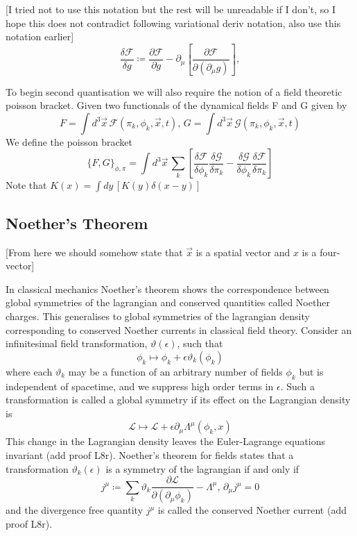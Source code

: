 \documentclass[11pt, a4paper]{article}
\theoremstyle{definition}
\theoremstyle{plain}
\begin{document}
[I tried not to use this notation but the rest will be unreadable if I don't, so I hope this
does not contradict following variational deriv notation, also use this notation earlier]
\begin{equation}
  \frac{\delta \mathcal{F}}{\delta g} \coloneq \frac{\partial \mathcal{F}}{\partial g}
  - \partial_\mu \left[ \frac{\partial \mathcal{F}}{\partial (\partial_\mu g)} \right],
\end{equation}

To begin second quantisation we will also require the notion of a field theoretic poisson bracket.
Given two functionals of the dynamical fields F and G given by 
\begin{equation}
  F = \int{d^3\vec{x}\, \mathcal{F}(\pi_k, \phi_k, \vec{x}, t)},\,
  G = \int{d^3\vec{x}\, \mathcal{G}(\pi_k, \phi_k, \vec{x}, t)}
\end{equation}
We define the poisson bracket
\begin{equation}
  {\{F, G \}}_{\phi,\pi} = \int{d^3\vec{x}\,
  \sum_{k}{\left[ \frac{\delta \mathcal{F}}{\delta \phi_k}\frac{\delta \mathcal{G}}{\delta \pi_k} 
- \frac{\delta \mathcal{G}}{\delta \phi_k}\frac{\delta \mathcal{F}}{\delta \pi_k} \right]}  }
\end{equation}
Note that $K({x}) = \int{d{y}\,[K({y}) \delta(x - y)]}$


\subsection{Noether's Theorem}
[From here we should somehow state that $\vec{x}$ is a spatial vector and $x$ is a four-vector]

In classical mechanics Noether's theorem shows the correspondence between global symmetries of 
the lagrangian and conserved quantities called Noether charges. This generalises to global symmetries
of the lagrangian density corresponding to conserved Noether currents in classical field theory.
Consider an infinitesimal field transformation, $\vartheta(\epsilon)$, such that
\begin{equation}
  \phi_k \mapsto \phi_k + \epsilon\vartheta_k(\phi_k)
\end{equation}
where each $\vartheta_k$ may be a function of an arbitrary number of fields $\phi_k$ but
is independent of spacetime, and we suppress high order terms in $\epsilon$.
Such a transformation is called a global symmetry if its effect on the Lagrangian density is
\begin{equation}
  \mathcal{L} \mapsto \mathcal{L} + \epsilon\partial_\mu\Lambda^\mu(\phi_k, x)
\end{equation}
This change in the Lagrangian density leaves the Euler-Lagrange equations invariant (add proof L8r).
Noether's theorem for fields states that a transformation $\vartheta_k(\epsilon)$ is a symmetry
of the lagrangian if and only if 
\begin{equation}
  j^\mu \coloneq
  \sum_{k}{\vartheta_k \frac{\partial \mathcal{L}}{\partial (\partial_\mu \phi_k)}}
  - \Lambda^\mu, \, \partial_\mu j^\mu = 0 
\end{equation}
and the divergence free quantity $j^\mu$ is called the conserved Noether current (add proof L8r).
\end{document}
